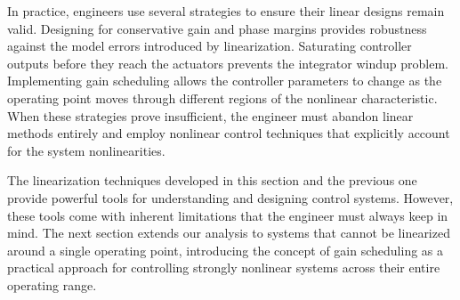 In practice, engineers use several strategies to ensure their linear designs remain valid. Designing for conservative gain and phase margins provides robustness against the model errors introduced by linearization. Saturating controller outputs before they reach the actuators prevents the integrator windup problem. Implementing gain scheduling allows the controller parameters to change as the operating point moves through different regions of the nonlinear characteristic. When these strategies prove insufficient, the engineer must abandon linear methods entirely and employ nonlinear control techniques that explicitly account for the system nonlinearities.

The linearization techniques developed in this section and the previous one provide powerful tools for understanding and designing control systems. However, these tools come with inherent limitations that the engineer must always keep in mind. The next section extends our analysis to systems that cannot be linearized around a single operating point, introducing the concept of gain scheduling as a practical approach for controlling strongly nonlinear systems across their entire operating range.
